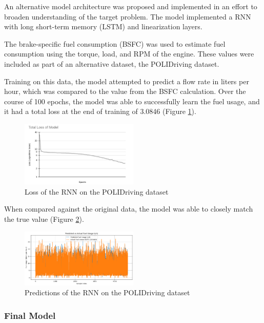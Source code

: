 \documentclass[letterpaper]{article}
\begin{document}
An alternative model architecture was proposed and implemented in an effort 
to broaden understanding of the target problem. The model implemented a 
RNN with long short-term memory (LSTM) and linearization layers.

The brake-specific fuel consumption (BSFC) was used to estimate fuel 
consumption using the torque, load, and RPM of the engine. These values 
were included as part of an alternative dataset, the POLIDriving dataset.

Training on this data, the model attempted to predict a flow rate in liters 
per hour, which was compared to the value from the BSFC calculation. Over 
the course of 100 epochs, the model was able to successfully learn the fuel 
usage, and it had a total loss at the end of training of 3.0846 
(Figure \ref{fig:lossrnn}).

\begin{figure}[h!]
    \centering
    \includegraphics[width=0.5\textwidth]{figures/loss.jpg}
    \caption{Loss of the RNN on the POLIDriving dataset}
    \label{fig:lossrnn}
\end{figure}

When compared against the original data, the model was able to closely 
match the true value (Figure \ref{fig:predictionrnn}).\\

\begin{figure}[h!]
    \centering
    \includegraphics[width=0.5\textwidth]{figures/rnn_predictions.png}
    \caption{Predictions of the RNN on the POLIDriving dataset}
    \label{fig:predictionrnn}
\end{figure}

\subsubsection*{Final Model}
\end{document}
